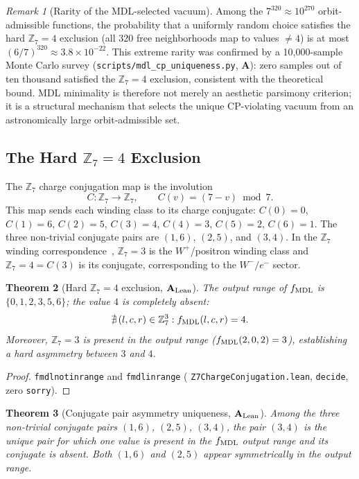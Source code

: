 \documentclass[11pt]{article}
\newtheorem{theorem}{Theorem}[section]
\theoremstyle{remark}
\newtheorem{remark}[theorem]{Remark}
\newcommand{\lean}[1]{%
  \penalty-100
  \begingroup\def\_{\textunderscore\allowbreak}\texttt{#1}\endgroup}
\newcommand{\CatA}{\textbf{A}}
\newcommand{\CatAL}{\ensuremath{\textbf{A}_{\rm Lean}}}
\begin{document}
\begin{remark}[Rarity of the MDL-selected vacuum]
Among the $7^{320} \approx 10^{270}$ orbit-admissible functions, the probability
that a uniformly random choice satisfies the hard $\mathbb{Z}_7 = 4$ exclusion
(all 320 free neighborhoods map to values $\neq 4$) is at most $(6/7)^{320} \approx
3.8 \times 10^{-22}$.
This extreme rarity was confirmed by a 10{,}000-sample Monte Carlo survey
(\texttt{scripts/mdl\_cp\_uniqueness.py}, $\CatA$): zero samples out of ten thousand
satisfied the $\mathbb{Z}_7 = 4$ exclusion, consistent with the theoretical bound.
MDL minimality is therefore not merely an aesthetic parsimony criterion; it is a
structural mechanism that selects the unique CP-violating vacuum from an
astronomically large orbit-admissible set.
\end{remark}

\subsection{The Hard \texorpdfstring{$\mathbb{Z}_7 = 4$}{Z7=4} Exclusion}
\label{sec:z4_exclusion}

The $\mathbb{Z}_7$ charge conjugation map is the involution
\[
C:\mathbb{Z}_7 \to \mathbb{Z}_7,\qquad C(v) = (7 - v) \bmod 7.
\]
This map sends each winding class to its charge conjugate:
$C(0) = 0$, $C(1) = 6$, $C(2) = 5$, $C(3) = 4$, $C(4) = 3$, $C(5) = 2$, $C(6) = 1$.
The three non-trivial conjugate pairs are $(1,6)$, $(2,5)$, and $(3,4)$.
In the $\mathbb{Z}_7$ winding correspondence~\cite{Spivack2026_SM_UGP},
$\mathbb{Z}_7 = 3$ is the $W^+$/positron winding class and $\mathbb{Z}_7 = 4 = C(3)$
is its conjugate, corresponding to the $W^-/e^-$ sector.

\begin{theorem}[Hard $\mathbb{Z}_7 = 4$ exclusion, $\CatAL$]\label{thm:z4_exclusion}
The output range of $f_{\rm MDL}$ is $\{0,1,2,3,5,6\}$; the value $4$ is completely absent:
\[
\nexists\,(l,c,r) \in \mathbb{Z}_7^3 : f_{\rm MDL}(l,c,r) = 4.
\]
Moreover, $\mathbb{Z}_7 = 3$ is present in the output range
($f_{\rm MDL}(2,0,2) = 3$), establishing a hard asymmetry between $3$ and $4$.
\end{theorem}

\begin{proof}
\lean{fmdl\_4\_not\_in\_range} and \lean{fmdl\_3\_in\_range}
(\lean{Z7ChargeConjugation.lean}, \texttt{decide}, zero \texttt{sorry}).
\end{proof}

\begin{theorem}[Conjugate pair asymmetry uniqueness, $\CatAL$]\label{thm:conj_asym}
Among the three non-trivial conjugate pairs $(1,6)$, $(2,5)$, $(3,4)$, the pair $(3,4)$
is the \emph{unique} pair for which one value is present in the $f_{\rm MDL}$ output range
and its conjugate is absent.
Both $(1,6)$ and $(2,5)$ appear symmetrically in the output range.
\end{theorem}
\end{document}

